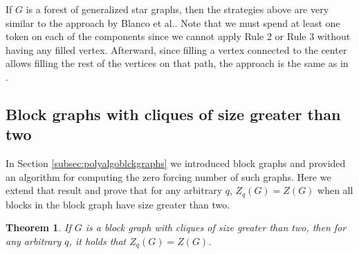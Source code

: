 \documentclass[11pt]{article}
\theoremstyle{plain}
\newtheorem{theorem}{Theorem}[section]
\theoremstyle{definition}
\theoremstyle{remark}
\begin{document}
If $G$ is a forest of generalized star graphs, then the strategies above are very similar to the approach by Blanco et al.\cite{blanco2023z_q}. Note that we must spend at least one token on each of the components since we cannot apply Rule 2 or Rule 3 without having any filled vertex. Afterward, since filling a vertex connected to the center allows filling the rest of the vertices on that path, the approach is the same as in \cite{blanco2023z_q}.


\subsection{Block graphs with cliques of size greater than two} \label{subsec: blockgraphs}

In Section \ref{subsec:polyalgoblckgraphs} we introduced block graphs and provided an algorithm for computing the zero forcing number of such graphs. Here we extend that result and prove that for any arbitrary $q$, $Z_q(G) = Z(G)$ when all blocks in the block graph have size greater than two.

\begin{theorem} \label{block_graphs_gen}
If $G$ is a block graph with cliques of size greater than two, then for any arbitrary $q$, it holds that $Z_q(G) = Z(G)$.
\end{theorem}
\end{document}
